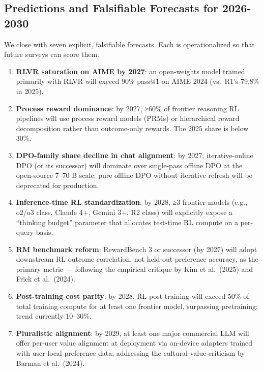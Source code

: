 \documentclass{article}
\begin{document}
\subsection{Predictions and Falsifiable Forecasts for 2026-2030}\label{predictions-and-falsifiable-forecasts-for-2026-2030}

We close with seven explicit, falsifiable forecasts. Each is operationalized so that future surveys can score them.

\begin{enumerate}
\def\labelenumi{\arabic{enumi}.}

\item
  \textbf{RLVR saturation on AIME by 2027}: an open-weights model trained primarily with RLVR will exceed 90\% pass@1 on AIME 2024 (vs.~R1's 79.8\% in 2025).
\item
  \textbf{Process reward dominance}: by 2027, ≥60\% of frontier reasoning RL pipelines will use process reward models (PRMs) or hierarchical reward decomposition rather than outcome-only rewards. The 2025 share is below 30\%.
\item
  \textbf{DPO-family share decline in chat alignment}: by 2027, iterative-online DPO (or its successor) will dominate over single-pass offline DPO at the open-source 7--70 B scale; pure offline DPO without iterative refresh will be deprecated for production.
\item
  \textbf{Inference-time RL standardization}: by 2028, ≥3 frontier models (e.g., o2/o3 class, Claude 4+, Gemini 3+, R2 class) will explicitly expose a ``thinking budget'' parameter that allocates test-time RL compute on a per-query basis.
\item
  \textbf{RM benchmark reform}: RewardBench 3 or successor (by 2027) will adopt downstream-RL outcome correlation, not held-out preference accuracy, as the primary metric --- following the empirical critique by Kim et al.~(2025) and Frick et al.~(2024).
\item
  \textbf{Post-training cost parity}: by 2028, RL post-training will exceed 50\% of total training compute for at least one frontier model, surpassing pretraining; trend currently 10--30\%.
\item
  \textbf{Pluralistic alignment}: by 2029, at least one major commercial LLM will offer per-user value alignment at deployment via on-device adapters trained with user-local preference data, addressing the cultural-value criticism by Barman et al.~(2024).
\end{enumerate}
\end{document}
